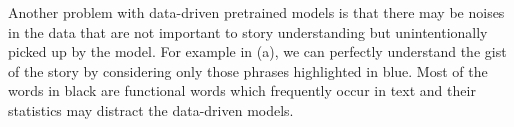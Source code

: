

Another problem with data-driven pretrained models is that there may be
noises in the data that are not important to story understanding but
unintentionally picked up by the model. For example in
(a), we can perfectly understand the gist of the story
by considering only those phrases highlighted in blue. Most of the words in
black are functional words which frequently occur in text and their statistics
may distract the data-driven models. 

